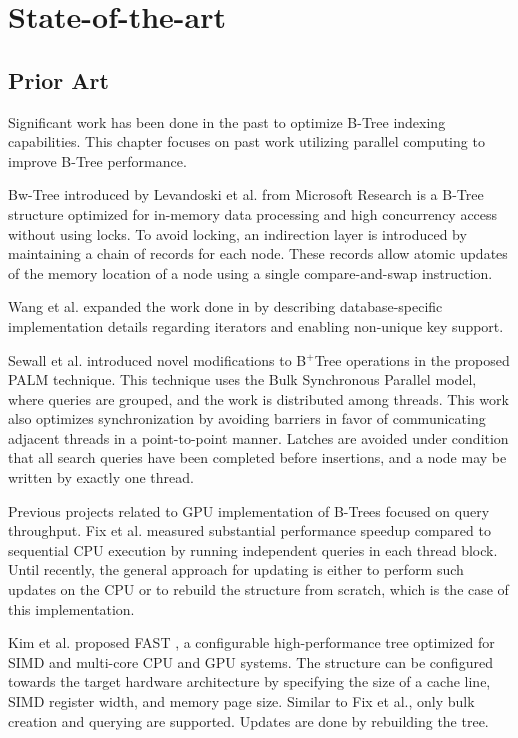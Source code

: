 \chapter{State-of-the-art}\label{chapter:state-of-art}

\section{Prior Art}

Significant work has been done in the past to optimize B-Tree indexing capabilities. This chapter focuses on past work utilizing parallel computing to improve B-Tree performance.

Bw-Tree introduced by Levandoski et al. \cite{bw-tree} from Microsoft Research is a B-Tree structure optimized for in-memory data processing and high concurrency access without using locks. To avoid locking, an indirection layer is introduced by maintaining a chain of records for each node. These records allow atomic updates of the memory location of a node using a single compare-and-swap instruction.

Wang et al. \cite{openbw-tree} expanded the work done in \cite{bw-tree} by describing database-specific implementation details regarding iterators and enabling non-unique key support.

Sewall et al. \cite{palm} introduced novel modifications to B$^+$Tree operations in the proposed PALM technique. This technique uses the Bulk Synchronous Parallel model, where queries are grouped, and the work is distributed among threads. This work also optimizes synchronization by avoiding barriers in favor of communicating adjacent threads in a point-to-point manner. Latches are avoided under condition that all search queries have been completed before insertions, and a node may be written by exactly one thread.

Previous projects related to GPU implementation of B-Trees focused on query throughput. Fix et al. \cite{fix2011accelerating} measured substantial performance speedup compared to sequential CPU execution by running independent queries in each thread block. Until recently, the general approach for updating is either to perform such updates on the CPU or to rebuild the structure from scratch, which is the case of this implementation.

Kim et al. proposed FAST \cite{fast}, a configurable high-performance tree optimized for SIMD and multi-core CPU and GPU systems. The structure can be configured towards the target hardware architecture by specifying the size of a cache line, SIMD register width, and memory page size. Similar to Fix et al., only bulk creation and querying are supported. Updates are done by rebuilding the tree.

